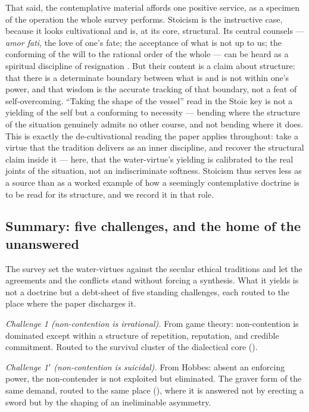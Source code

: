 That said, the contemplative material affords one positive service, as a specimen of the operation the whole survey performs. Stoicism is the instructive case, because it looks cultivational and is, at its core, structural. Its central counsels --- \emph{amor fati}, the love of one's fate; the acceptance of what is not up to us; the conforming of the will to the rational order of the whole --- can be heard as a spiritual discipline of resignation \parencite{marcus2002,epicurus1994}. But their content is a claim about structure: that there is a determinate boundary between what is and is not within one's power, and that wisdom is the accurate tracking of that boundary, not a feat of self-overcoming. ``Taking the shape of the vessel'' read in the Stoic key is not a yielding of the self but a conforming to necessity --- bending where the structure of the situation genuinely admits no other course, and not bending where it does. This is exactly the de-cultivational reading the paper applies throughout: take a virtue that the tradition delivers as an inner discipline, and recover the structural claim inside it --- here, that the water-virtue's yielding is calibrated to the real joints of the situation, not an indiscriminate softness. Stoicism thus serves less as a source than as a worked example of how a seemingly contemplative doctrine is to be read for its structure, and we record it in that role.

\subsection{Summary: five challenges, and the home of the unanswered}
\label{p20:sub:review-summary}

The survey set the water-virtues against the secular ethical traditions and let the agreements and the conflicts stand without forcing a synthesis. What it yields is not a doctrine but a debt-sheet of five standing challenges, each routed to the place where the paper discharges it.

\emph{Challenge 1 (non-contention is irrational).} From game theory: non-contention is dominated except within a structure of repetition, reputation, and credible commitment. Routed to the survival cluster of the dialectical core ().

\emph{Challenge 1$'$ (non-contention is suicidal).} From Hobbes: absent an enforcing power, the non-contender is not exploited but eliminated. The graver form of the same demand, routed to the same place (), where it is answered not by erecting a sword but by the shaping of an ineliminable asymmetry.

